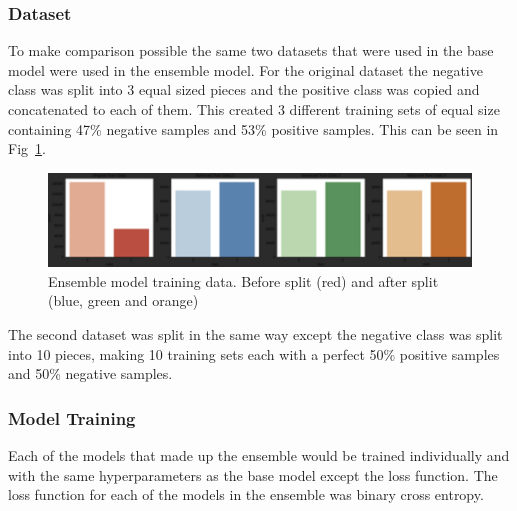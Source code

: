 \documentclass[conference]{IEEEtran}
\begin{document}
\subsubsection{Dataset}
To make comparison possible the same two datasets that were used in the base
model were used in the ensemble model. For the original dataset the negative
class was split into 3 equal sized pieces and the positive class was copied and
concatenated to each of them. This created 3 different training sets of equal
size containing 47\% negative samples and 53\% positive samples. This can be seen
in Fig~\ref{ensemble_data_split}.
\begin{figure}[bp]
  \centering
  \includegraphics[scale=0.2]{ensemble_data_split.png}
  \caption{Ensemble model training data.  Before split (red) and after split
    (blue, green and orange)}
  \label{ensemble_data_split}
\end{figure}
The second dataset was split in the same way except the negative class was
split into 10 pieces, making 10 training sets each with a perfect 50\% positive
samples and 50\% negative samples.
\subsubsection{Model Training}
Each of the models that made up the ensemble would be trained individually and
with the same hyperparameters as the base model except the loss function. The
loss function for each of the models in the ensemble was binary cross entropy.
\end{document}

